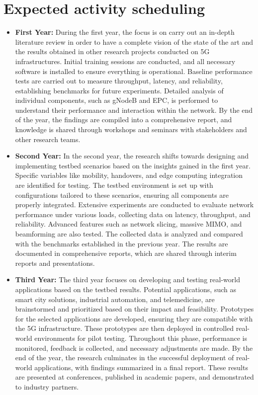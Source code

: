 \documentclass{report}
\begin{document}
\section{Expected activity scheduling}
\begin{itemize}
	\item \textbf{First Year:} During the first year, the focus is on carry out an in-depth literature review in order to have a complete vision of the state of the art and the results obtained in other research projects conducted on 5G infrastructures. Initial training sessions are conducted, and all necessary software is installed to ensure everything is operational. Baseline performance tests are carried out to measure throughput, latency, and reliability, establishing benchmarks for future experiments. Detailed analysis of individual components, such as gNodeB and EPC, is performed to understand their performance and interaction within the network. By the end of the year, the findings are compiled into a comprehensive report, and knowledge is shared through workshops and seminars with stakeholders and other research teams.
	\item \textbf{Second Year:} In the second year, the research shifts towards designing and implementing testbed scenarios based on the insights gained in the first year. Specific variables like mobility, handovers, and edge computing integration are identified for testing. The testbed environment is set up with configurations tailored to these scenarios, ensuring all components are properly integrated. Extensive experiments are conducted to evaluate network performance under various loads, collecting data on latency, throughput, and reliability. Advanced features such as network slicing, massive MIMO, and beamforming are also tested. The collected data is analyzed and compared with the benchmarks established in the previous year. The results are documented in comprehensive reports, which are shared through interim reports and presentations.
	\item \textbf{Third Year:} The third year focuses on developing and testing real-world applications based on the testbed results. Potential applications, such as smart city solutions, industrial automation, and telemedicine, are brainstormed and prioritized based on their impact and feasibility. Prototypes for the selected applications are developed, ensuring they are compatible with the 5G infrastructure. These prototypes are then deployed in controlled real-world environments for pilot testing. Throughout this phase, performance is monitored, feedback is collected, and necessary adjustments are made. By the end of the year, the research culminates in the successful deployment of real-world applications, with findings summarized in a final report. These results are presented at conferences, published in academic papers, and demonstrated to industry partners.
\end{itemize}
\end{document}
